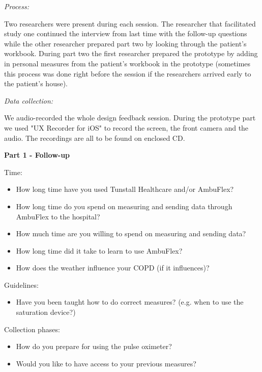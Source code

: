 \textit{Process:}

Two researchers were present during each session. The researcher that facilitated study one continued the interview from last time with the follow-up questions while the other researcher prepared part two by looking through the patient's workbook. During part two the first researcher prepared the prototype by adding in personal measures from the patient's workbook in the prototype (sometimes this process was done right before the session if the researchers arrived early to the patient's house).

\textit{Data collection:}

We audio-recorded the whole design feedback session. During the prototype part we used "UX Recorder for iOS" to record the screen, the front camera and the audio. The recordings are all to be found on enclosed CD.

\textbf{Part 1 - Follow-up}

Time:
\begin{itemize}
\item How long time have you used Tunstall Healthcare and/or AmbuFlex?%
\item How long time do you spend on measuring and sending data through  AmbuFlex to the hospital?%
\item How much time are you willing to spend on measuring and sending data?%
\item How long time did it take to learn to use AmbuFlex?%
\item How does the weather influence your COPD (if it influences)? %
\end{itemize}

Guidelines:
\begin{itemize}
\item Have you been taught how to do correct measures? (e.g. when to use the saturation device?) %
\end{itemize}

Collection phases:
\begin{itemize}
\item How do you prepare for using the pulse oximeter?%
\item Would you like to have access to your previous measures?%
\end{itemize}


